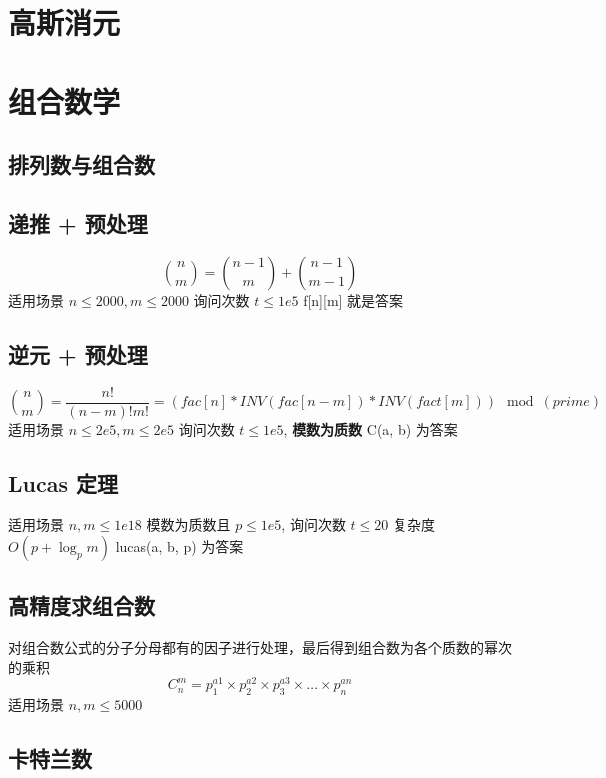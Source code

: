 \documentclass{probook}
\begin{document}
\section{高斯消元}

\section{组合数学}
\subsection{排列数与组合数}

\subsection{递推 + 预处理}
$$
\binom{n}{m} = \binom{n-1}{m} + \binom{n-1}{m-1}
$$
适用场景 $n \le 2000, m \le 2000$ 询问次数 $t \le 1e5$
f[n][m] 就是答案

\subsection{逆元 + 预处理}
$$
\binom{n}{m} = \dfrac{n!}{(n-m)!m!} = (fac[n] * INV(fac[n-m]) * INV(fact[m])) \mod (prime)
$$
适用场景 $n \le 2e5, m \le 2e5$ 询问次数 $t \le 1e5$, \textbf{模数为质数}
C(a, b) 为答案

\subsection{Lucas 定理}
适用场景 $n, m \le 1e18$ 模数为质数且 $p \le 1e5$, 询问次数 $t \le 20$
复杂度 $O(p + \log_p m)$
lucas(a, b, p) 为答案

\subsection{高精度求组合数}
对组合数公式的分子分母都有的因子进行处理，最后得到组合数为各个质数的幂次的乘积
$$
C_n^m = p_1^{a1} \times p_2^{a2}\times p_3^{a3}\times \dots \times p_n^{an}
$$
适用场景 $n, m \le 5000$

\subsection{卡特兰数} 


\end{document}
